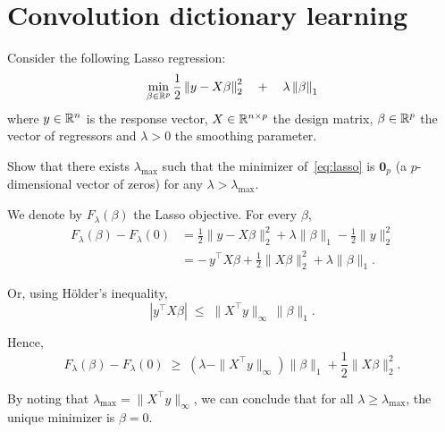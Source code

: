 \documentclass[11pt]{article}
\begin{document}
\section{Convolution dictionary learning}

\begin{exercise}
Consider the following Lasso regression:
\begin{equation}\label{eq:lasso}
    \min_{\beta\in\mathbb{R}^p} \frac{1}{2}\left\lVert y-X\beta\right\rVert^2_2 \quad + \quad \lambda \left\lVert\beta\right\rVert_1
\end{equation}
where $y\in\mathbb{R}^n$ is the response vector, $X\in\mathbb{R}^{n\times p}$ the design matrix, $\beta\in\mathbb{R}^p$ the vector of regressors and $\lambda>0$ the smoothing parameter.

Show that there exists $\lambda_{\max}$ such that the minimizer of~\eqref{eq:lasso} is $\mathbf{0}_p$ (a $p$-dimensional vector of zeros) for any $\lambda > \lambda_{\max}$. 
\end{exercise}

\begin{solution}  %
    We denote by \( F_\lambda(\beta) \) the Lasso objective.  
    For every \( \beta \),
    \begin{equation}
    \begin{aligned}
    F_\lambda(\beta) - F_\lambda(0)
    &= \frac{1}{2}\|y - X\beta\|_2^2 + \lambda \|\beta\|_1 - \frac{1}{2}\|y\|_2^2 \\[6pt]
    &= -\,y^\top X\beta + \frac{1}{2}\|X\beta\|_2^2 + \lambda \|\beta\|_1.
    \end{aligned}
    \end{equation}

    Or, using Hölder's inequality,
    \begin{equation}
        |y^\top X\beta| \;\leq\; \|X^\top y\|_\infty \, \|\beta\|_1.
    \end{equation}

    Hence,
    \begin{equation}
        F_\lambda(\beta) - F_\lambda(0)
        \;\geq\;
        \left( \lambda - \|X^\top y\|_\infty \right) \|\beta\|_1
        + \frac{1}{2}\|X\beta\|_2^2.
    \end{equation}

By noting that \(\lambda_{\max} = \|X^\top y\|_\infty\), we can conclude that for all \(\lambda \geq \lambda_{\max}\), the unique minimizer is \(\beta = 0\).

\end{solution}
\end{document}
